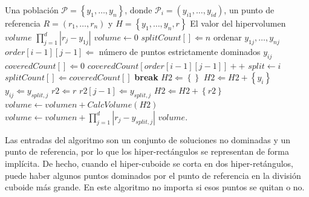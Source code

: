   \begin{algorithm}
  \begin{algorithmic}[1]
	\REQUIRE Una poblaci\'on $\mathcal{P}=\left\{y_1,\ldots,y_n\right\}$, donde $\mathcal{P}_i = \left(y_{i 1},\ldots,y_{i d}\right) $, 
	un punto de referencia $R=\left(r_1,\ldots,r_n\right)$ y $H =\left\{y_1,\ldots,y_n, r\right\}$
	\ENSURE El valor del hipervolumen $volume$
		\RETURN $\prod^{d}_{j=1}\left|r_j - y_ {1 j}\right|$
	\ENDIF
	\STATE $volume \leftarrow 0$
	\STATE $splitCount\left[\right]\Leftarrow n$
		\STATE ordenar $y_{1j},\ldots,y_{nj}$
			\STATE $order\left[i-1\right]\left[j-1\right]\Leftarrow$ n\'umero de puntos 
			estrictamente dominados $y_{ij}$ 
		\ENDFOR
	\ENDFOR
			\STATE $coveredCount\left[\right]\Leftarrow 0$
				\STATE $coveredCount\left[order\left[i-1\right]\left[j-1\right]\right]++$			
			\ENDFOR
					\STATE $split \leftarrow i$
					\STATE $splitCount\left[\right]\Leftarrow coveredCount\left[\right]$
					\STATE \textbf{break}					
				\ENDIF				
			\ENDFOR
	\ENDFOR
			\STATE $H2\Leftarrow\left\{\right\}$
					\STATE $H2\Leftarrow H2+\left\{y_i\right\}$
					\STATE $y_{ij} \Leftarrow y_{split,j}$
				\ENDIF				
			\ENDFOR
			\STATE $r2\Leftarrow r$
			\STATE $r2\left[j-1\right]\Leftarrow  y_{split,j}$
			\STATE $H2\Leftarrow H2 + \left\{r2\right\}$
			\STATE $volume \leftarrow volumen + CalcVolume\left(H2\right)$
		\ENDIF
	\ENDFOR
	\STATE $volume \leftarrow volumen + \prod^{d}_{j=1}\left|r_j - y_ {split,j}\right|$
	\RETURN $volume$.
\end{algorithmic}
\caption{$CalcVolume\left(H\right)$}
\label{alg:hv}
\end{algorithm}

  Las entradas del algoritmo son un conjunto de soluciones no dominadas y un punto de referencia, por lo que los 
  hiper-rect\'angulos se representan de forma impl\'icita. De hecho, cuando el hiper-cuboide se corta en dos  
  hiper-ret\'angulos, puede haber algunos puntos dominados por el punto de referencia en la divisi\'on cuboide m\'as 
  grande. En este algoritmo no importa si esos puntos se quitan o no. 
 
